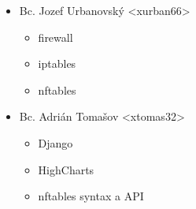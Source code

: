 	\begin{itemize}
		\item Bc. Jozef Urbanovský <xurban66>
		\begin{itemize}
			\item firewall
			\item iptables
			\item nftables
		\end{itemize}
	
		\item Bc. Adrián Tomašov <xtomas32>
		\begin{itemize}
			\item Django
			\item HighCharts
			\item nftables syntax a API
		\end{itemize}
		
	\end{itemize}
	


